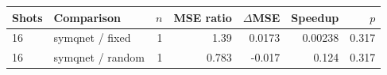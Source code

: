 \begin{tabular}{llrrrrr}
\toprule
Shots & Comparison & $n$ & MSE ratio & $\Delta$MSE & Speedup & $p$ \\
\midrule
16 & symqnet / fixed & 1 & 1.39 & 0.0173 & 0.00238 & 0.317 \\
16 & symqnet / random & 1 & 0.783 & -0.017 & 0.124 & 0.317 \\
\bottomrule
\end{tabular}
